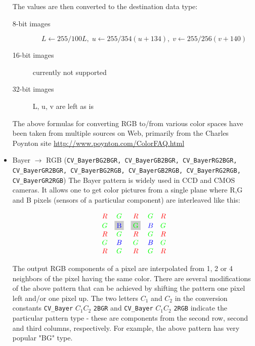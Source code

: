 \begin{itemize}
The values are then converted to the destination data type:
\begin{description}
\item[8-bit images]
\[L \leftarrow 255/100 L,\; u \leftarrow 255/354 (u + 134),\; v \leftarrow 255/256 (v + 140) \]
\item[16-bit images] currently not supported
\item[32-bit images] L, u, v are left as is
\end{description}

The above formulas for converting RGB to/from various color spaces have been taken from multiple sources on Web, primarily from the Charles Poynton site \url{http://www.poynton.com/ColorFAQ.html}

 \item Bayer $\rightarrow$ RGB (\texttt{CV\_BayerBG2BGR, CV\_BayerGB2BGR, CV\_BayerRG2BGR, CV\_BayerGR2BGR, CV\_BayerBG2RGB, CV\_BayerGB2RGB, CV\_BayerRG2RGB, CV\_BayerGR2RGB}) The Bayer pattern is widely used in CCD and CMOS cameras. It allows one to get color pictures from a single plane where R,G and B pixels (sensors of a particular component) are interleaved like this:

\newcommand{\Rcell}{\color{red}R}
\newcommand{\Gcell}{\color{green}G}
\newcommand{\Bcell}{\color{blue}B}


\[
\definecolor{BackGray}{rgb}{0.8,0.8,0.8}
\begin{array}{ c c c c c }
\Rcell&\Gcell&\Rcell&\Gcell&\Rcell\\
\Gcell&\colorbox{BackGray}{\Bcell}&\colorbox{BackGray}{\Gcell}&\Bcell&\Gcell\\
\Rcell&\Gcell&\Rcell&\Gcell&\Rcell\\
\Gcell&\Bcell&\Gcell&\Bcell&\Gcell\\
\Rcell&\Gcell&\Rcell&\Gcell&\Rcell
\end{array}
\]

The output RGB components of a pixel are interpolated from 1, 2 or
4 neighbors of the pixel having the same color. There are several
modifications of the above pattern that can be achieved by shifting
the pattern one pixel left and/or one pixel up. The two letters
$C_1$ and $C_2$
in the conversion constants
\texttt{CV\_Bayer} $ C_1 C_2 $ \texttt{2BGR}
and
\texttt{CV\_Bayer} $ C_1 C_2 $ \texttt{2RGB}
indicate the particular pattern
type - these are components from the second row, second and third
columns, respectively. For example, the above pattern has very
popular "BG" type.
\end{itemize}



